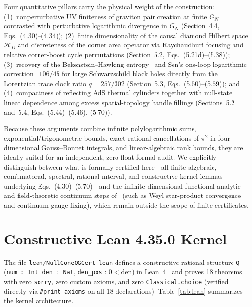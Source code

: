 \documentclass[10pt,twocolumn]{article}
\begin{document}
Four quantitative pillars carry the physical weight of the construction: (1)~nonperturbative UV finiteness of graviton pair creation at finite $G_N$ contrasted with perturbative logarithmic divergence in $G_N$ (Section~4.4, Eqs.~(4.30)--(4.34)); (2)~finite dimensionality of the causal diamond Hilbert space $\mathcal{H}_D$ and discreteness of the corner area operator via Raychaudhuri focusing and relative corner-boost cycle permutations (Section~5.2, Eqs.~(5.21d)--(5.38)); (3)~recovery of the Bekenstein--Hawking entropy~\cite{Bekenstein1973,Hawking1975} and Sen's one-loop logarithmic correction~\cite{Sen2013} $106/45$ for large Schwarzschild black holes directly from the Lorentzian trace clock ratio $q = 257/302$ (Section~5.3, Eqs.~(5.50)--(5.69)); and (4)~compactness of reflecting AdS thermal cylinders together with null-state linear dependence among excess spatial-topology handle fillings (Sections~5.2 and~5.4, Eqs.~(5.44)--(5.46), (5.70)).

Because these arguments combine infinite polylogarithmic sums, exponential/trigonometric bounds, exact rational cancellations of $\pi^2$ in four-dimensional Gauss--Bonnet integrals, and linear-algebraic rank bounds, they are ideally suited for an independent, zero-float formal audit. We explicitly distinguish between what is formally certified here---all finite algebraic, combinatorial, spectral, rational-interval, and constructive kernel lemmas underlying Eqs.~(4.30)--(5.70)---and the infinite-dimensional functional-analytic and field-theoretic continuum steps of~\cite{Chandrasekaran2026} (such as Weyl star-product convergence and continuum gauge-fixing), which remain outside the scope of finite certificates.

\section{Constructive Lean 4.35.0 Kernel}
The file \texttt{lean/NullConeQGCert.lean} defines a constructive rational structure \texttt{Q} (\texttt{num : Int}, \texttt{den : Nat}, \texttt{den\_pos} : $0 < \mathrm{den}$) in Lean~4~\cite{Lean4} and proves 18 theorems with zero \texttt{sorry}, zero custom axioms, and zero \texttt{Classical.choice} (verified directly via \texttt{\#print axioms} on all 18 declarations). Table~\ref{tab:lean} summarizes the kernel architecture.
\end{document}
